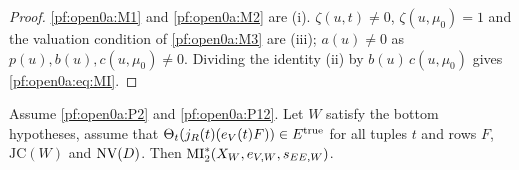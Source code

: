 \begin{proof}
\ref{pf:open0a:M1} and \ref{pf:open0a:M2} are (i). $\zeta(u,t)\ne0$, $\zeta(u,\mu_0)=1$ and the valuation condition of
\ref{pf:open0a:M3} are (iii); $a(u)\ne0$ as $p(u),b(u),c(u,\mu_0)\ne0$. Dividing the identity (ii) by
$b(u)\,c(u,\mu_0)$ gives \eqref{pf:open0a:eq:MI}.
\end{proof}

\begin{theorem}\label{pf:open0a:final}
Assume \ref{pf:open0a:P2} and \ref{pf:open0a:P12}. Let $W$ satisfy the bottom hypotheses, assume that
$\Theta_t(j_R(t)(e_V(t)F))\in E^{\mathrm{true}}$ for all tuples $t$ and rows $F$, $\mathrm{JC}(W)$ and $\mathrm{NV}(D)$.
Then $\mathrm{MI}^{*}_{2}(X_W,e_{V,W},s_{EE,W})$.
\
\end{theorem}

